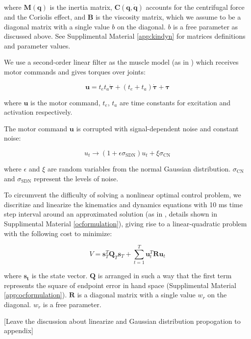 where $\bm{M}(\bm{q})$ is the inertia matrix, $\bm{C}(\bm{q}, \dot{\bm{q}})$ accounts for the centrifugal force and the Coriolis effect, and $\bm{B}$ is the viscosity matrix, which we assume to be a diagonal matrix with a single value $b$ on the diagonal. $b$ is a free parameter as discussed above. 
See Supplimental Material \ref{app:kindyn} for matrices definitions and parameter values.

We use a second-order linear filter as the muscle model (as in \cite{VanBeers2004}) which receives motor commands and gives torques over joints:

\begin{equation}
	\bm{u} = t_et_a\ddot{\bm{\tau}} + (t_e+t_a)\dot{\bm{\tau}} +\bm{\tau}
\end{equation}

where $\bm{u}$ is the motor command, $t_e$, $t_a$ are time constants for excitation and activation respectively. 

The motor command $\bm{u}$ is corrupted with signal-dependent noise and constant noise:

\begin{equation}\label{cnsdn}
u_t \rightarrow (1 + \epsilon\sigma_{\text{SDN}}) u_t + \xi\sigma_{\text{CN}}
\end{equation}

where $\epsilon$ and $\xi$ are random variables from the normal Gaussian distribution.
$\sigma_{\text{CN}}$ and $\sigma_{\text{SDN}}$ represent the levels of noise.

To circumvent the difficulty of solving a nonlinear optimal control problem, we discritize and linearize the kinematics and dynamics equations with 10 ms time step interval around an approximated solution (as in \cite{Li2004}, details shown in Supplimental Material \ref{ocformulation}), giving rise to a linear-quadratic problem with the following cost to minimize:

\begin{equation}
V = \bm{s}_T^T\bm{Q}_T\bm{s}_T + \sum_{t=1}^T\bm{u}_t^T\bm{Ru}_t
\end{equation}

where $\bm{s_t}$ is the state vector. 
$\bm{Q}$ is arranged in such a way that the first term represents the square of endpoint error in hand space (Supplimental Material \ref{app:ocformulation}). 
$\bm{R}$ is a diagonal matrix with a single value $w_r$ on the diagonal.
$w_r$ is a free parameter.

[Leave the discussion about linearize and Gaussian distribution propogation to appendix]


